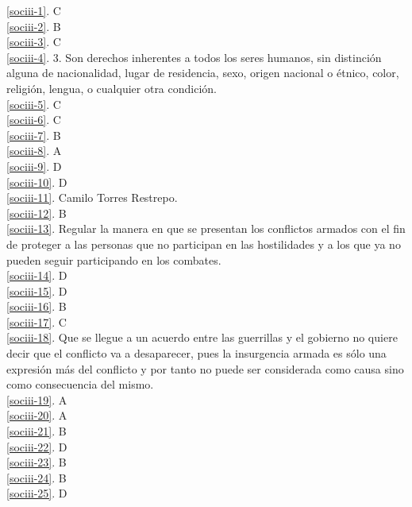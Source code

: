 \noindent \ref{sociii-1}. C\\
\ref{sociii-2}. B\\
\ref{sociii-3}. C\\
\ref{sociii-4}. 3. Son derechos inherentes a todos los seres humanos, sin distinción alguna de nacionalidad, lugar de residencia, sexo, origen nacional o étnico, color, religión, lengua, o cualquier otra condición. \\ 
\ref{sociii-5}. C \\
\ref{sociii-6}. C\\
\ref{sociii-7}. B\\
\ref{sociii-8}. A\\
\ref{sociii-9}. D \\ 
\ref{sociii-10}. D\\
\ref{sociii-11}. Camilo Torres Restrepo.\\
\ref{sociii-12}. B\\
\ref{sociii-13}. Regular la manera en que se presentan los conflictos armados con el fin de proteger a las personas que no participan en las hostilidades y a los que ya no pueden seguir participando en los combates.\\
\ref{sociii-14}. D\\
\ref{sociii-15}. D\\
\ref{sociii-16}. B\\
\ref{sociii-17}. C\\
\ref{sociii-18}. Que se llegue a un acuerdo entre las guerrillas y el gobierno no quiere decir que el conflicto va a desaparecer, pues la insurgencia armada es sólo una expresión más del conflicto y por tanto no puede ser considerada como causa sino como consecuencia del mismo.\\
\ref{sociii-19}. A\\
\ref{sociii-20}. A\\
\ref{sociii-21}. B\\
\ref{sociii-22}. D\\
\ref{sociii-23}. B\\
\ref{sociii-24}. B\\
\ref{sociii-25}. D\\

